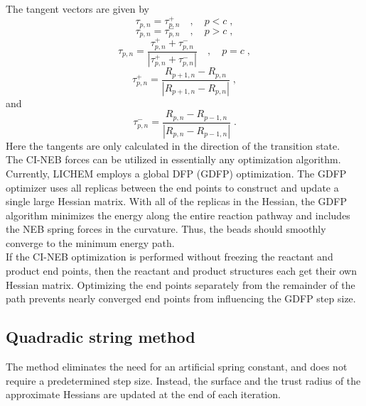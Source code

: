 \documentclass[12pt]{report}
\begin{document}
The tangent vectors are given 
by \cite{NEB2000_A}
\begin{equation}
 \tau_{p,n} = \tau_{p,n}^{+}
 \quad , \quad
 p < c \; ,
\end{equation}
\begin{equation}
 \tau_{p,n} = \tau_{p,n}^{-}
 \quad , \quad
 p > c \; ,
\end{equation}
\begin{equation}
 \tau_{p,n} = \frac{\tau_{p,n}^{+}+\tau_{p,n}^{-}}
 {|\tau_{p,n}^{+}+\tau_{p,n}^{-}|}
 \quad , \quad
 p = c \; ,
\end{equation}
\begin{equation}
 \tau_{p,n}^{+} = \frac{R_{p+1,n}-R_{p,n}}{|R_{p+1,n}-R_{p,n}|} \; ,
\end{equation}
and
\begin{equation}
 \tau_{p,n}^{-} = \frac{R_{p,n}-R_{p-1,n}}{|R_{p,n}-R_{p-1,n}|} \; .
\end{equation}
Here the tangents are only calculated in the direction of the transition
state. \\

The CI-NEB forces can be utilized in essentially any optimization algorithm.
Currently, LICHEM employs a global DFP (GDFP) optimization.
The GDFP optimizer uses all replicas between the end points to construct and
update a single large Hessian matrix.
With all of the replicas in the Hessian, the GDFP algorithm minimizes the
energy along the entire reaction pathway and includes the NEB spring forces
in the curvature.
Thus, the beads should smoothly converge to the minimum energy path. \\

If the CI-NEB optimization is performed without freezing the reactant and
product end points, then the reactant and product structures each get their
own Hessian matrix.
Optimizing the end points separately from the remainder of the path prevents
nearly converged end points from influencing the GDFP step size.

\subsection{Quadradic string method}

The method eliminates the need for an artificial spring constant, 
and does not require a predetermined step size. 
Instead,  the surface and 
the trust radius of the approximate Hessians are updated 
at the end of each iteration. \\
\end{document}
